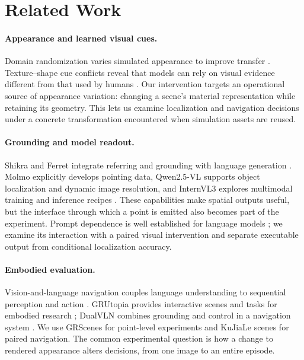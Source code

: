 \section{Related Work}

\paragraph{Appearance and learned visual cues.}
Domain randomization varies simulated appearance to improve transfer
\citep{Tobin2017Domain,Tremblay2018Training}. Texture--shape cue conflicts reveal
that models can rely on visual evidence different from that used by humans
\citep{Geirhos2019Texture}. Our intervention targets an operational source of
appearance variation: changing a scene's material representation while retaining
its geometry. This lets us examine localization and navigation decisions under
a concrete transformation encountered when simulation assets are reused.

\paragraph{Grounding and model readout.}
Shikra and Ferret integrate referring and grounding with language generation
\citep{Chen2023Shikra,You2024Ferret}. Molmo explicitly develops pointing data,
Qwen2.5-VL supports object localization and dynamic image resolution, and
InternVL3 explores multimodal training and inference recipes
\citep{Deitke2024Molmo,Bai2025Qwen,Zhu2025InternVL}. These capabilities make
spatial outputs useful, but the interface through which a point is emitted
also becomes part of the experiment. Prompt dependence is well established for
language models \citep{Zhao2021Calibrate}; we examine its interaction with a
paired visual intervention and separate executable output from conditional
localization accuracy.

\paragraph{Embodied evaluation.}
Vision-and-language navigation couples language understanding to sequential
perception and action \citep{Anderson2018Vision}. GRUtopia provides interactive
scenes and tasks for embodied research \citep{Wang2024GRUtopia}; DualVLN combines
grounding and control in a navigation system \citep{Wei2026Ground}. We use
GRScenes for point-level experiments and KuJiaLe scenes for paired navigation.
The common experimental question is how a change to rendered appearance alters
decisions, from one image to an entire episode.
